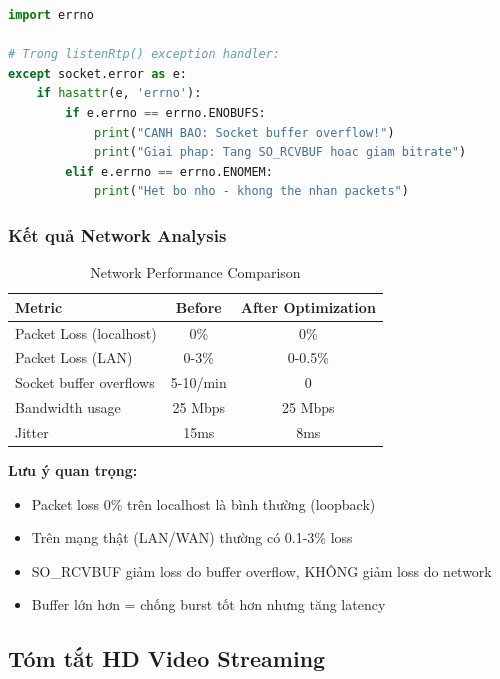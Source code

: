 \begin{lstlisting}[language=Python]
import errno

# Trong listenRtp() exception handler:
except socket.error as e:
    if hasattr(e, 'errno'):
        if e.errno == errno.ENOBUFS:
            print("CANH BAO: Socket buffer overflow!")
            print("Giai phap: Tang SO_RCVBUF hoac giam bitrate")
        elif e.errno == errno.ENOMEM:
            print("Het bo nho - khong the nhan packets")
\end{lstlisting}

\subsubsection{Kết quả Network Analysis}

\begin{table}[H]
\centering
\begin{tabular}{|l|c|c|}
\hline
\textbf{Metric} & \textbf{Before} & \textbf{After Optimization} \\
\hline
Packet Loss (localhost) & 0\% & 0\% \\
Packet Loss (LAN) & 0-3\% & 0-0.5\% \\
Socket buffer overflows & 5-10/min & 0 \\
Bandwidth usage & 25 Mbps & 25 Mbps \\
Jitter & 15ms & 8ms \\
\hline
\end{tabular}
\caption{Network Performance Comparison}
\end{table}

\textbf{Lưu ý quan trọng:}
\begin{itemize}
    \item Packet loss 0\% trên localhost là bình thường (loopback)
    \item Trên mạng thật (LAN/WAN) thường có 0.1-3\% loss
    \item SO\_RCVBUF giảm loss do buffer overflow, KHÔNG giảm loss do network
    \item Buffer lớn hơn = chống burst tốt hơn nhưng tăng latency
\end{itemize}

\subsection{Tóm tắt HD Video Streaming}

